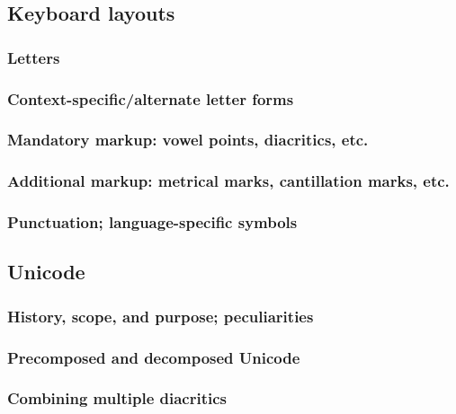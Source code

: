 \documentclass[11pt]{article}
\begin{document}
\subsection{Keyboard layouts}
\label{sec:org4d8f93e}

\subsubsection{Letters}
\label{sec:org9f23cb6}

\subsubsection{Context-specific/alternate letter forms}
\label{sec:orgcc0e61d}

\subsubsection{Mandatory markup: vowel points, diacritics, etc.}
\label{sec:org23c0e3b}

\subsubsection{Additional markup: metrical marks, cantillation marks, etc.}
\label{sec:orgd4c12f4}

\subsubsection{Punctuation; language-specific symbols}
\label{sec:org5492e43}

\subsection{Unicode}
\label{sec:org4919ce7}

\subsubsection{History, scope, and purpose; peculiarities}
\label{sec:org0df9043}

\subsubsection{Precomposed and decomposed Unicode}
\label{sec:org2105857}

\subsubsection{Combining multiple diacritics}
\label{sec:org4e659ff}
\end{document}
